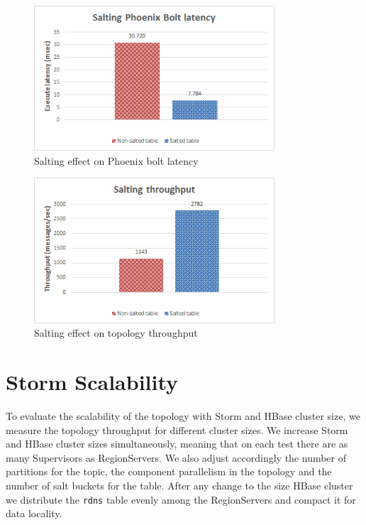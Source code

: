 \begin{figure}[H]
\centering
\includegraphics[width=0.8\textwidth]{figures/benchmarks_storm_salting_latency}
\caption{Salting effect on Phoenix bolt latency}
\label{figure:benchmarks_storm_salting_latency}
\end{figure}

\begin{figure}[H]
\centering
\includegraphics[width=0.8\textwidth]{figures/benchmarks_storm_salting_throughput}
\caption{Salting effect on topology throughput}
\label{figure:benchmarks_storm_salting_throughput}
\end{figure}


\section{Storm Scalability}\label{section:benchmarks_storm_scalability}

To evaluate the scalability of the topology with Storm and HBase cluster size, we measure the topology throughput for different cluster sizes. We increase Storm and HBase cluster sizes simultaneously, meaning that on each test there are as many Supervisors as RegionServers. We also adjust accordingly the number of partitions for the topic, the component parallelism in the topology and the number of salt buckets for the table. After any change to the size HBase cluster we distribute the \texttt{rdns} table evenly among the RegionServers and compact it for data locality.

